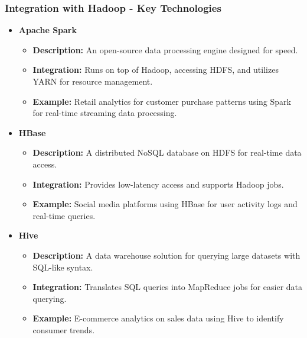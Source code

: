\documentclass[aspectratio=169]{beamer}
\begin{document}
\begin{frame}[fragile]
    \frametitle{Integration with Hadoop - Key Technologies}
    \begin{itemize}
        \item \textbf{Apache Spark}
        \begin{itemize}
            \item \textbf{Description:} An open-source data processing engine designed for speed. 
            \item \textbf{Integration:} Runs on top of Hadoop, accessing HDFS, and utilizes YARN for resource management.
            \item \textbf{Example:} Retail analytics for customer purchase patterns using Spark for real-time streaming data processing.
        \end{itemize}

        \item \textbf{HBase}
        \begin{itemize}
            \item \textbf{Description:} A distributed NoSQL database on HDFS for real-time data access.
            \item \textbf{Integration:} Provides low-latency access and supports Hadoop jobs.
            \item \textbf{Example:} Social media platforms using HBase for user activity logs and real-time queries.
        \end{itemize}

        \item \textbf{Hive}
        \begin{itemize}
            \item \textbf{Description:} A data warehouse solution for querying large datasets with SQL-like syntax.
            \item \textbf{Integration:} Translates SQL queries into MapReduce jobs for easier data querying.
            \item \textbf{Example:} E-commerce analytics on sales data using Hive to identify consumer trends.
        \end{itemize}
    \end{itemize}
\end{frame}
\end{document}

